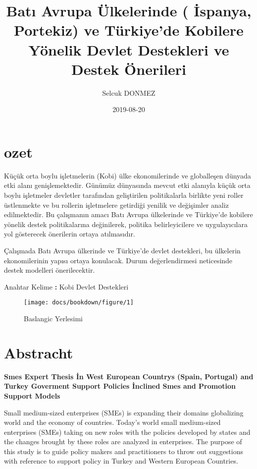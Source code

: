 \documentclass[]{book}
\title{Batı Avrupa Ülkelerinde ( İspanya, Portekiz) ve Türkiye'de Kobilere Yönelik Devlet Destekleri ve Destek Önerileri}
\author{Selcuk DONMEZ}
\date{2019-08-20}
\newenvironment{Shaded}{\begin{snugshade}}{\end{snugshade}}
\newcommand{\NormalTok}[1]{#1}
\newcommand{\OperatorTok}[1]{\textcolor[rgb]{0.81,0.36,0.00}{\textbf{#1}}}
\begin{document}
\maketitle

{
\setcounter{tocdepth}{1}
\tableofcontents
}
\hypertarget{ozet}{%
\chapter{ozet}\label{ozet}}

Küçük orta boylu işletmelerin (Kobi) ülke ekonomilerinde ve globalleşen dünyada etki alanı genişlemektedir. Günümüz dünyasında mevcut etki alanıyla küçük orta boylu işletmeler devletler tarafından geliştirilen politikalarla birlikte yeni roller üstlenmekte ve bu rollerin işletmelere getirdiği yenilik ve değişimler analiz edilmektedir. Bu çalışmanın amacı Batı Avrupa ülkelerinde ve Türkiye'de kobilere yönelik destek politikalarına değinilerek, politika belirleyicilere ve uygulayıcılara yol gösterecek önerilerin ortaya atılmasıdır.

Çalışmada Batı Avrupa ülkerinde ve Türkiye'de devlet destekleri, bu ülkelerin ekonomilerinin yapısı ortaya konulacak. Durum değerlendirmesi neticesinde destek modelleri önerilecektir.

\begin{Shaded}
\begin{Highlighting}[]
\NormalTok{Anahtar Kelime }\OperatorTok{:}
\NormalTok{Kobi}
\NormalTok{Devlet Destekleri}
\end{Highlighting}
\end{Shaded}

\begin{figure}

{\centering \texttt{[image: docs/bookdown/figure/1]} 

}

\caption{ Baslangic Yerlesimi}\label{fig:resim}
\end{figure}

\hypertarget{abstracht}{%
\chapter{Abstracht}\label{abstracht}}

\textbf{Smes Expert Thesis İn West European Countrys (Spain, Portugal) and Turkey Goverment Support Policies İnclined Smes and Promotion Support Models }

Small medium-sized enterprises (SMEs) is expanding their domains globalizing world and the economy of countries. Today's world small medium-sized enterprises (SMEs) taking on new roles with the policies developed by states and the changes brought by these roles are analyzed in enterprises. The purpose of this study is to guide policy makers and practitioners to throw out suggestions with reference to support policy in Turkey and Western European Countries.
\end{document}

